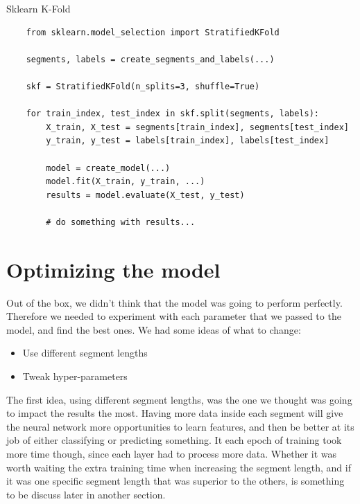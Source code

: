 \begin{code}
    \caption{Sklearn K-Fold}
    \label{code:sklearn_k_fold}
    
    \begin{verbatim}
    from sklearn.model_selection import StratifiedKFold

    segments, labels = create_segments_and_labels(...)

    skf = StratifiedKFold(n_splits=3, shuffle=True)

    for train_index, test_index in skf.split(segments, labels):
        X_train, X_test = segments[train_index], segments[test_index]
        y_train, y_test = labels[train_index], labels[test_index]

        model = create_model(...)
        model.fit(X_train, y_train, ...)
        results = model.evaluate(X_test, y_test)

        # do something with results...

    \end{verbatim}
\end{code}

\section{Optimizing the model}

\noindent Out of the box, we didn't think that the model was going to perform perfectly. Therefore we needed to experiment with each parameter that we passed to
the model, and find the best ones. We had some ideas of what to change:

\begin{itemize}
    \item Use different segment lengths
    \item Tweak hyper-parameters
\end{itemize}

\noindent The first idea, using different segment lengths, was the one we thought was going to impact the results the most. Having more data inside each segment 
will give the neural network more opportunities to learn features, and then be better at its job of either classifying or predicting something. 
It each epoch of training took more time though, since each layer had to process more data. Whether it was worth waiting the extra training time 
when increasing the segment length, and if it was one specific segment length that was superior to the others, is something to be discuss later in another section. 

